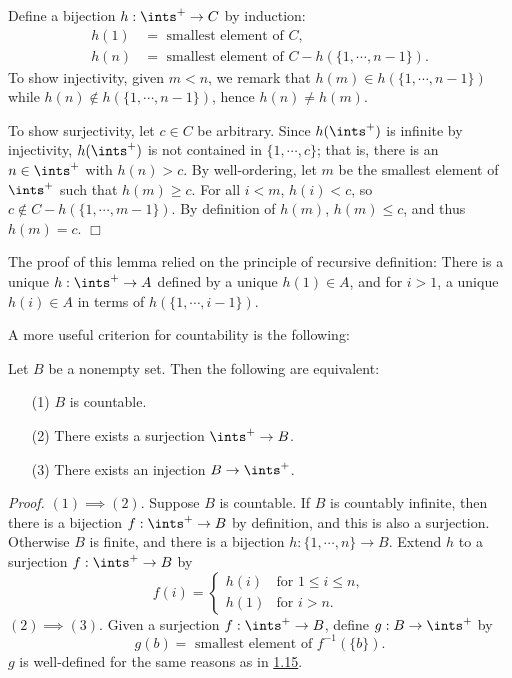 Define a bijection $h: \ints^+ \rightarrow C$ by induction:
\begin{align*}
    h(1) &= \text{ smallest element of } C, \\
    h(n) &= \text{ smallest element of } C - h(\{1, \cdots, n-1\}).
\end{align*}
To show injectivity, given $m<n$, we remark that $h(m) \in h(\{1, \cdots, n-1\})$ while $h(n) \notin h(\{1, \cdots, n-1\})$, hence $h(n) \neq h(m)$.

To show surjectivity, let $c \in C$ be arbitrary. Since $h(\ints^+)$ is infinite by injectivity, $h(\ints^+)$ is not contained in $\{1, \cdots, c\}$; that is, there is an $n \in \ints^+$ with $h(n) > c$. By well-ordering, let $m$ be the smallest element of $\ints^+$ such that $h(m) \geq c.$ For all $i< m$, $h(i) < c$, so $c \notin C- h(\{1, \cdots, m-1\})$. By definition of $h(m)$, $h(m) \leq c$, and thus $h(m) = c$. $\Box$

The proof of this lemma relied on the principle of recursive definition: There is a unique $h: \ints^+ \rightarrow A$ defined by a unique $h(1) \in A$, and for $i>1$, a unique $h(i) \in A$ in terms of $h(\{1, \cdots, i-1\})$. 

A more useful criterion for countability is the following:
\begin{theorem}\label{1.19}
    Let $B$ be a nonempty set. Then the following are equivalent:
    \begin{enumerate}
        \item[(1)] $B$ is countable.
        \item[(2)] There exists a surjection $\ints^+ \rightarrow B$.
        \item[(3)] There exists an injection $B \rightarrow \ints^+$.
    \end{enumerate}
\end{theorem}
{\it Proof.} $(1) \implies (2)$. Suppose $B$ is countable. If $B$ is countably infinite, then there is a bijection $f: \ints^+ \rightarrow B$ by definition, and this is also a surjection. Otherwise $B$ is finite, and there is a bijection $h: \{1, \cdots, n\} \rightarrow B$. Extend $h$ to a surjection $f: \ints^+ \rightarrow B$ by
$$f(i) = \begin{cases}
    h(i) &\text{for }1 \leq i \leq n, \\
    h(1) &\text{for }i > n.
\end{cases}$$
$(2) \implies (3)$. Given a surjection $f: \ints^+ \rightarrow B$, define $g: B \rightarrow \ints^+$ by
$$g(b) = \text{ smallest element of } f^{-1}(\{b\}).$$
$g$ is well-defined for the same reasons as in \hyperref[1.15]{1.15}.

